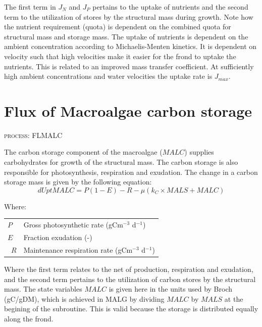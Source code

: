 \documentclass{deltares_manual}
\begin{document}
The first term in $J_{N}$ and $J_{P}$ pertains to the uptake of nutrients and the second term to the utilization of stores by the structural mass during growth. Note how the nutrient requirement (quota) is dependent on the combined quota for structural mass and storage mass. The uptake of nutrients is dependent on the ambient concentration according to Michaelis-Menten kinetics. It is dependent on velocity such that high velocities make it easier for the frond to uptake the nutrients. This is related to an improved mass transfer coefficient. At sufficiently high ambient concentrations and water velocities the uptake rate is $J_{max}$.
\pagebreak

\section{Flux of Macroalgae carbon storage}
\begin{flushright}
\textsc{process: FLMALC}
\end{flushright}

The carbon storage component of the macroalgae ($MALC$) supplies carbohydrates for growth of the structural mass. The carbon storage is also responsible for photosynthesis, respiration and exudation. The change in a carbon storage mass is given by the following equation:
\begin{equation}
dUptMALC = P(1-E)-R - \mu(k_C \times MALS + MALC)
\end{equation}

Where:\\

\begin{tabular}{ll}
$P$ & Gross photosynthetic rate (gCm$^{-3}$ d$^{-1}$)\\
$E$ & Fraction exudation (-)\\\
$R$ & Maintenance respiration rate (gCm$^{-3}$ d$^{-1}$)\\
\end{tabular}

Where the first term relates to the net of production, respiration and exudation, and the second term pertains to the utilization of carbon stores by the structural mass. The state variables $MALC$ is given here in the units used by Broch (gC/gDM), which is achieved in MALG by dividing $MALC$ by $MALS$ at the begining of the subroutine. This is valid because the storage is distributed equally along the frond.
\end{document}
